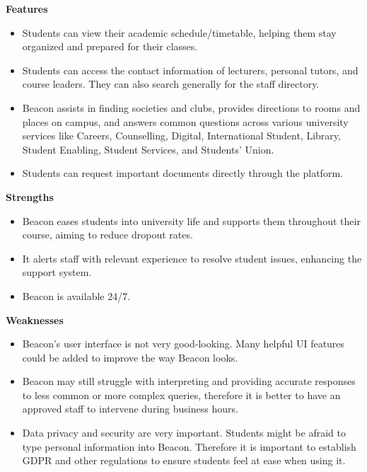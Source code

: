 \documentclass{l4proj}
\begin{document}
\textbf{Features}

\begin{itemize}

    \item Students can view their academic schedule/timetable, helping them stay organized and prepared for their classes.

    \item Students can access the contact information of lecturers, personal tutors, and course leaders. They can also search generally for the staff directory.

    \item Beacon assists in finding societies and clubs, provides directions to rooms and places on campus, and answers common questions across various university services like Careers, Counselling, Digital, International Student, Library, Student Enabling, Student Services, and Students' Union.

    \item Students can request important documents directly through the platform.
    
\end{itemize}

\textbf{Strengths}

\begin{itemize}

   \item Beacon eases students into university life and supports them throughout their course, aiming to reduce dropout rates.
   
   \item It alerts staff with relevant experience to resolve student issues, enhancing the support system.
   
   \item  Beacon is available 24/7.

\end{itemize}

\textbf{Weaknesses}

\begin{itemize}

    \item Beacon's user interface is not very good-looking. Many helpful UI features could be added to improve the way Beacon looks.
    
    \item Beacon may still struggle with interpreting and providing accurate responses to less common or more complex queries, therefore it is better to have an approved staff to intervene during business hours.
    
    \item Data privacy and security are very important. Students might be afraid to type personal information into Beacon. Therefore it is important to establish GDPR and other regulations to ensure students feel at ease when using it.

\end{itemize}
\end{document}
